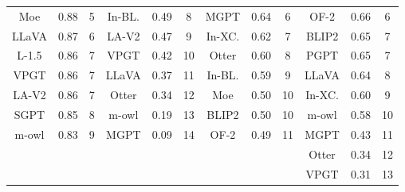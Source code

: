 \begin{table}[t]
{\begin{tabular}{ccc|ccc|ccc|ccc}
Moe       & \multicolumn{1}{l|}{0.88}  & 5    & In-BL.  & \multicolumn{1}{l|}{0.49} & 8 & MGPT      & \multicolumn{1}{l|}{0.64}  & 6    & OF-2    & \multicolumn{1}{l|}{0.66}  & 6    \\
LLaVA   & \multicolumn{1}{l|}{0.87}  & 6    & LA-V2& \multicolumn{1}{l|}{0.47}      & 9 & In-XC.    & \multicolumn{1}{l|}{0.62}  & 7    & BLIP2   & \multicolumn{1}{l|}{0.65}  & 7    \\
L-1.5     & \multicolumn{1}{l|}{0.86}  & 7    & VPGT& \multicolumn{1}{l|}{0.42}     & 10 & Otter    & \multicolumn{1}{l|}{0.60}  & 8    & PGPT    & \multicolumn{1}{l|}{0.65}  & 7    \\
VPGT  & \multicolumn{1}{l|}{0.86}  & 7    & LLaVA   & \multicolumn{1}{l|}{0.37}     & 11& In-BL.    & \multicolumn{1}{l|}{0.59}  & 9    & LLaVA   & \multicolumn{1}{l|}{0.64}  & 8    \\
LA-V2   & \multicolumn{1}{l|}{0.86}  & 7   & Otter & \multicolumn{1}{l|}{0.34}      & 12& Moe       & \multicolumn{1}{l|}{0.50}  & 10   & In-XC.  & \multicolumn{1}{l|}{0.60}  & 9   \\
SGPT  & \multicolumn{1}{l|}{0.85}  & 8   & m-owl  & \multicolumn{1}{l|}{0.19}       & 13& BLIP2     & \multicolumn{1}{l|}{0.50}  & 10   & m-owl   & \multicolumn{1}{l|}{0.58}  & 10   \\ 
m-owl & \multicolumn{1}{l|}{0.83} & 9 &MGPT & \multicolumn{1}{l|}{0.09}             & 14& OF-2      & \multicolumn{1}{l|}{0.49}  & 11   & MGPT    & \multicolumn{1}{l|}{0.43}  & 11 \\
      & \multicolumn{1}{l|}{   } &   &     & \multicolumn{1}{l|}{   }             &  &              & \multicolumn{1}{l|}{   }  &      & Otter    & \multicolumn{1}{l|}{0.34}  & 12 \\
      & \multicolumn{1}{l|}{   } &   &     & \multicolumn{1}{l|}{   }             &  &              & \multicolumn{1}{l|}{   }  &      & VPGT     & \multicolumn{1}{l|}{0.31}  & 13 \\
\hline
\end{tabular}}
\end{table}

